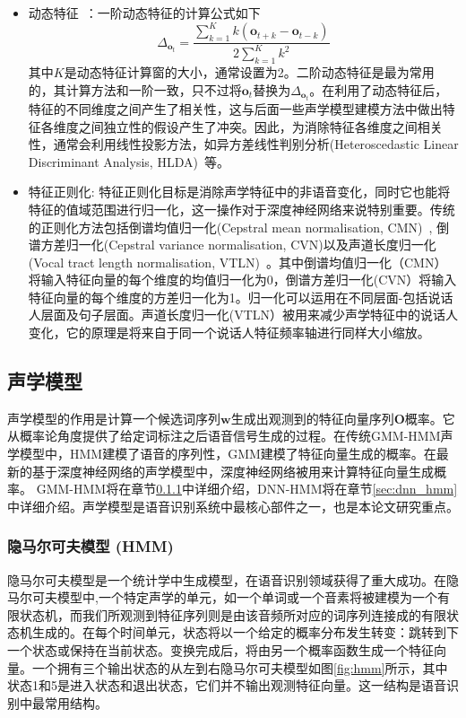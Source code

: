 \begin{itemize}
    \item 动态特征~\cite{furui1986speaker}：一阶动态特征的计算公式如下
    \begin{equation}
        \Delta_{\mathbf{o}_t}=\frac{\sum_{k=1}^K k(\mathbf{o}_{t+k}-\mathbf{o}_{t-k})}{2\sum_{k=1}^K{k^2}}
    \end{equation}
    其中$K$是动态特征计算窗的大小，通常设置为2。二阶动态特征是最为常用的，其计算方法和一阶一致，只不过将$\mathbf{o}_t$替换为$\Delta_{\mathbf{o}_t}$。在利用了动态特征后，特征的不同维度之间产生了相关性，这与后面一些声学模型建模方法中做出特征各维度之间独立性的假设产生了冲突。因此，为消除特征各维度之间相关性，通常会利用线性投影方法，如异方差线性判别分析(Heteroscedastic Linear Discriminant Analysis, HLDA)~\cite{kumar1998heteroscedastic}等。
    \item 特征正则化: 特征正则化目标是消除声学特征中的非语音变化，同时它也能将特征的值域范围进行归一化，这一操作对于深度神经网络来说特别重要。传统的正则化方法包括倒谱均值归一化(Cepstral mean normalisation, CMN)~\cite{atal1974effectiveness}, 倒谱方差归一化(Cepstral variance normalisation, CVN)\cite{woodland1995development}以及声道长度归一化(Vocal tract length normalisation, VTLN)~\cite{lee1996speaker}。其中倒谱均值归一化（CMN）将输入特征向量的每个维度的均值归一化为0，倒谱方差归一化(CVN）将输入特征向量的每个维度的方差归一化为1。归一化可以运用在不同层面-包括说话人层面及句子层面。声道长度归一化(VTLN）被用来减少声学特征中的说话人变化，它的原理是将来自于同一个说话人特征频率轴进行同样大小缩放。
\end{itemize}

\subsection{声学模型}
声学模型的作用是计算一个候选词序列$\mathbf{w}$生成出观测到的特征向量序列$\mathbf{O}$概率。它从概率论角度提供了给定词标注之后语音信号生成的过程。在传统GMM-HMM声学模型中，HMM建模了语音的序列性，GMM建模了特征向量生成的概率。在最新的基于深度神经网络的声学模型中，深度神经网络被用来计算特征向量生成概率。 GMM-HMM将在章节\ref{sec:hmm}中详细介绍，DNN-HMM将在章节\ref{sec:dnn_hmm}中详细介绍。声学模型是语音识别系统中最核心部件之一，也是本论文研究重点。

\subsubsection{隐马尔可夫模型 (HMM)}
\label{sec:hmm}
隐马尔可夫模型是一个统计学中生成模型，在语音识别领域获得了重大成功。在隐马尔可夫模型中,一个特定声学的单元，如一个单词或一个音素将被建模为一个有限状态机，而我们所观测到特征序列则是由该音频所对应的词序列连接成的有限状态机生成的。在每个时间单元，状态将以一个给定的概率分布发生转变：跳转到下一个状态或保持在当前状态。变换完成后，将由另一个概率函数生成一个特征向量。一个拥有三个输出状态的从左到右隐马尔可夫模型如图\ref{fig:hmm}所示，其中状态1和5是进入状态和退出状态，它们并不输出观测特征向量。这一结构是语音识别中最常用结构。

